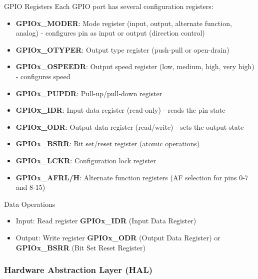 \begin{definition}{GPIO Registers}
Each GPIO port has several configuration registers:
\begin{itemize}
    \item \textbf{GPIOx\_MODER}: Mode register (input, output, alternate function, analog) - configures pin as input or output (direction control)
    \item \textbf{GPIOx\_OTYPER}: Output type register (push-pull or open-drain)
    \item \textbf{GPIOx\_OSPEEDR}: Output speed register (low, medium, high, very high) - configures speed
    \item \textbf{GPIOx\_PUPDR}: Pull-up/pull-down register
    \item \textbf{GPIOx\_IDR}: Input data register (read-only) - reads the pin state
    \item \textbf{GPIOx\_ODR}: Output data register (read/write) - sets the output state
    \item \textbf{GPIOx\_BSRR}: Bit set/reset register (atomic operations)
    \item \textbf{GPIOx\_LCKR}: Configuration lock register
    \item \textbf{GPIOx\_AFRL/H}: Alternate function registers (AF selection for pins 0-7 and 8-15)
\end{itemize}
\end{definition}

\begin{corollary}{Data Operations}
    \begin{itemize}
        \item Input: Read register \textbf{GPIOx\_IDR} (Input Data Register)
        \item Output: Write register \textbf{GPIOx\_ODR} (Output Data Register) or \textbf{GPIOx\_BSRR} (Bit Set Reset Register)
    \end{itemize}
\end{corollary}

\subsubsection{Hardware Abstraction Layer (HAL)}

